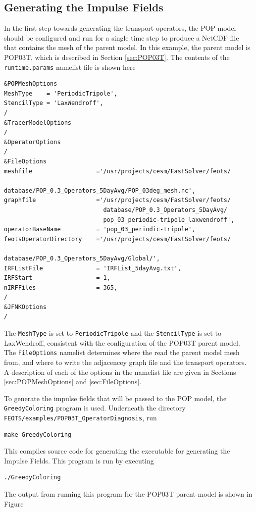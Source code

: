 \documentclass{softwaremanual}
\begin{document}
\subsection{Generating the Impulse Fields}
In the first step towards generating the transport operators, the POP model should be configured and run for a single time step to produce a NetCDF file that contains the mesh of the parent model. In this example, the parent model is POP03T, which is described in Section \ref{sec:POP03T}. The contents of the \texttt{runtime.params} namelist file is shown here 
\begin{verbatim}
&POPMeshOptions
MeshType    = 'PeriodicTripole',
StencilType = 'LaxWendroff',
/
&TracerModelOptions
/
&OperatorOptions
/
&FileOptions
meshfile                  ='/usr/projects/cesm/FastSolver/feots/
                            database/POP_0.3_Operators_5DayAvg/POP_03deg_mesh.nc',
graphfile                 ='/usr/projects/cesm/FastSolver/feots/
                            database/POP_0.3_Operators_5DayAvg/
                            pop_03_periodic-tripole_laxwendroff',
operatorBaseName          = 'pop_03_periodic-tripole',
feotsOperatorDirectory    ='/usr/projects/cesm/FastSolver/feots/
                            database/POP_0.3_Operators_5DayAvg/Global/',
IRFListFile               = 'IRFList_5dayAvg.txt',
IRFStart                  = 1,
nIRFFiles                 = 365,
/
&JFNKOptions
/
\end{verbatim}

The \texttt{MeshType} is set to \texttt{PeriodicTripole} and the \texttt{StencilType} is set to LaxWendroff, consistent with the configuration of the POP03T parent model. The \texttt{FileOptions} namelist determines where the read the parent model mesh from, and where to write the adjacencey graph file and the transport operators. A description of each of the options in the namelist file are given in Sections \ref{sec:POPMeshOptions} and \ref{sec:FileOptions}.

To generate the impulse fields that will be passed to the POP model, the \texttt{GreedyColoring} program is used. Underneath the directory \texttt{FEOTS/examples/POP03T\_OperatorDiagnosis}, run
\begin{verbatim}
make GreedyColoring
\end{verbatim}
This compiles source code for generating the executable for generating the Impulse Fields. This program is run by executing
\begin{verbatim}
./GreedyColoring
\end{verbatim}
The output from running this program for the POP03T parent model is shown in Figure
\end{document}
